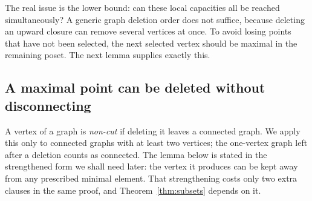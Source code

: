 \documentclass[11pt,letterpaper]{article}
\theoremstyle{definition}
\theoremstyle{remark}
\begin{document}
The real issue is the lower bound: can these local capacities all be reached
simultaneously? A generic graph deletion order does not suffice, because
deleting an upward closure can remove several vertices at once. To avoid
losing points that have not been selected, the next selected vertex should be
maximal in the remaining poset. The next lemma supplies exactly this.

\subsection{A maximal point can be deleted without disconnecting}

A vertex of a graph is \emph{non-cut} if deleting it leaves a connected
graph. We apply this only to connected graphs with at least two vertices;
the one-vertex graph left after a deletion counts as connected. The lemma
below is stated in the strengthened form we shall need later: the vertex it
produces can be kept away from any prescribed minimal element. That
strengthening costs only two extra clauses in the same proof, and
Theorem~\ref{thm:subsets} depends on it.
\end{document}
